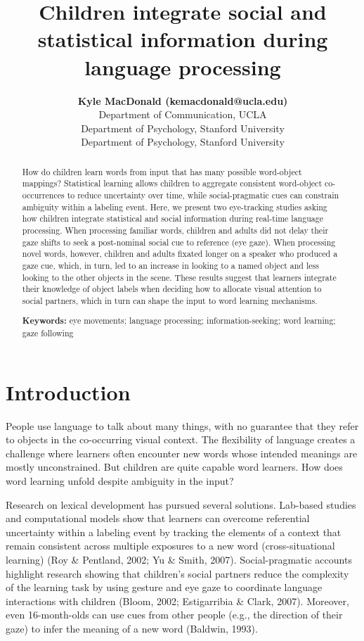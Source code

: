 \documentclass[10pt, letterpaper]{article}
\title{Children integrate social and statistical information during language
processing}
\author{{\large \bf Kyle MacDonald (kemacdonald@ucla.edu)} \\ Department of Communication, UCLA  \AND {\large \bf Elizabeth Swanson (elizswan@stanford.edu)} \\ Department of Psychology, Stanford University  \AND {\large \bf Michael C. Frank (mcfrank@stanford.edu)} \\ Department of Psychology, Stanford University  }
\begin{document}
\maketitle

\begin{abstract}
How do children learn words from input that has many possible
word-object mappings? Statistical learning allows children to aggregate
consistent word-object co-occurrences to reduce uncertainty over time,
while social-pragmatic cues can constrain ambiguity within a labeling
event. Here, we present two eye-tracking studies asking how children
integrate statistical and social information during real-time language
processing. When processing familiar words, children and adults did not
delay their gaze shifts to seek a post-nominal social cue to reference
(eye gaze). When processing novel words, however, children and adults
fixated longer on a speaker who produced a gaze cue, which, in turn, led
to an increase in looking to a named object and less looking to the
other objects in the scene. These results suggest that learners
integrate their knowledge of object labels when deciding how to allocate
visual attention to social partners, which in turn can shape the input
to word learning mechanisms.

\textbf{Keywords:}
eye movements; language processing; information-seeking; word learning;
gaze following
\end{abstract}

\hypertarget{introduction}{%
\section{Introduction}\label{introduction}}

People use language to talk about many things, with no guarantee that
they refer to objects in the co-occurring visual context. The
flexibility of language creates a challenge where learners often
encounter new words whose intended meanings are mostly unconstrained.
But children are quite capable word learners. How does word learning
unfold despite ambiguity in the input?

Research on lexical development has pursued several solutions. Lab-based
studies and computational models show that learners can overcome
referential uncertainty within a labeling event by tracking the elements
of a context that remain consistent across multiple exposures to a new
word (cross-situational learning) (Roy \& Pentland, 2002; Yu \& Smith,
2007). Social-pragmatic accounts highlight research showing that
children's social partners reduce the complexity of the learning task by
using gesture and eye gaze to coordinate language interactions with
children (Bloom, 2002; Estigarribia \& Clark, 2007). Moreover, even
16-month-olds can use cues from other people (e.g., the direction of
their gaze) to infer the meaning of a new word (Baldwin, 1993).
\end{document}
